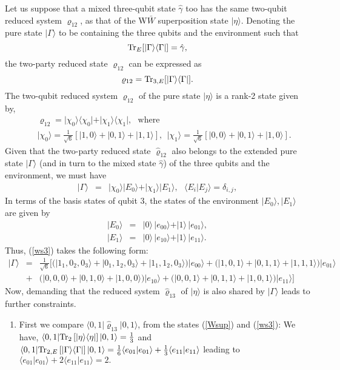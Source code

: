 \documentclass[pra,preprint,a4paper,superscriptaddress]{revtex4}
\begin{document}
{Let us suppose that a mixed  three-qubit state $\hat\gamma$ too has the same two-qubit reduced system $\varrho_{12}$, 
as that of the W$\bar W$ superposition state $\vert \eta\rangle.$ Denoting the pure state $\vert \Gamma\rangle$ to be  
containing the three qubits and the environment such that  
\[ 
{\rm Tr}_{E}[\vert\Gamma\rangle\langle \Gamma\vert]=\hat\gamma,
\] 
the two-party reduced state $\varrho_{12}$ can be expressed as  
$$\varrho_{12}={\rm Tr}_{3, E}[\vert \Gamma\rangle\langle \Gamma\vert].$$ 
The two-qubit reduced system $\varrho_{12}$ of the pure  
state $\vert\eta\rangle$ is a rank-2 state given by,  
\begin{eqnarray}
\label{ws2}
& &\varrho_{12}=\vert \chi_0\rangle\langle \chi_0\vert + 
\vert \chi_1\rangle\langle \chi_1\vert, \ \ \ \mbox{where} \\ 
& &\vert \chi_0\rangle=\frac{1}{\sqrt{6}}[|1,0\rangle+|0,1\rangle+|1,1\rangle], \ \ 
   \vert \chi_1\rangle=\frac{1}{\sqrt{6}}[|0,0\rangle+|0,1\rangle+|1,0\rangle].  \nonumber
\end{eqnarray}
Given that the two-party reduced state $\hat{\varrho}_{12}$ also belongs to the extended pure state 
$\vert\Gamma\rangle$ (and in turn to the mixed state $\hat\gamma$) of the three qubits and the environment, we must have  
\begin{eqnarray}
\label{ws3}
\vert\Gamma\rangle&=&\vert \chi_0\rangle\vert E_0\rangle +\vert \chi_1\rangle\vert E_1\rangle, \ \ \ \langle E_i\vert E_j\rangle=\delta_{i,j},
 \end{eqnarray}     
In terms of the basis states of qubit 3, the states of the environment 
$\vert E_{0}\rangle, \vert E_{1}\rangle$ are given by
\begin{eqnarray}
\vert E_0\rangle&=&\vert 0\rangle\,  \vert e_{00}\rangle+\vert 1\rangle\,  \vert e_{01}\rangle, \nonumber\\ 
\vert E_1\rangle&=&\vert 0\rangle\,  \vert e_{10}\rangle+\vert 1\rangle\,  \vert e_{11}\rangle.
\end{eqnarray}   
Thus,   (\ref{ws3}) takes the following  form: 
\begin{eqnarray} 
\label{Gamma}
|\Gamma\rangle&=&\frac{1}{\sqrt{6}}[(|1_1,0_2,0_3\rangle+|0_1,1_2,0_3\rangle+|1_1,1_2,0_3\rangle)|e_{00}\rangle 
+(|1,0,1\rangle+|0,1,1\rangle+|1,1,1\rangle)|e_{01}\rangle \nonumber \\
&+& (|0,0,0\rangle+|0,1,0\rangle+|1,0,0\rangle)|e_{10}\rangle
+(|0,0,1\rangle +|0,1,1\rangle+|1,0,1\rangle)|e_{11}\rangle] 
\end{eqnarray}
Now, demanding that the reduced system $\hat{\varrho}_{13}$ of $\vert \eta\rangle$ is also shared by  $\vert 
\Gamma\rangle$ leads to further constraints.  
\begin{enumerate}
\item First we compare  $\langle 0,1\vert \hat{\varrho}_{13}\vert 0,1\rangle$,  from the states 
(\ref{Wsup}) and (\ref{ws3}): We have,  
$\langle 0,1|{\rm Tr}_{2}\,[\vert\eta\rangle \langle\eta\vert]\, |0,1\rangle= 
\frac{1}{3}$ and \break 
$\langle 0,1|{\rm Tr}_{2,E}\,[\vert\Gamma\rangle \langle\Gamma\vert]\, |0,1\rangle= 
\frac{1}{6}\langle e_{01}|e_{01}\rangle+\frac{1}{3}\langle e_{11}|e_{11}\rangle$ 
leading to  
$\langle e_{01}|e_{01}\rangle+2\langle e_{11}|e_{11}\rangle=2.$ 
 


\end{enumerate}}
\end{document}
